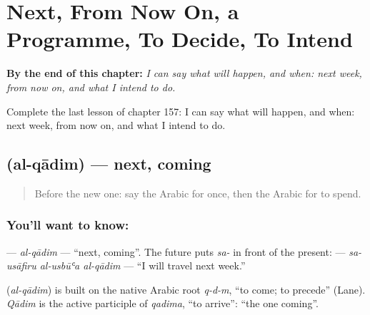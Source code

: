 
\chapter{Next, From Now On, a Programme, To Decide, To Intend}
\label{ch:ar-next-from-now-on-a-programme-to-decide-to-intend}

\begin{chapteropening}
\textbf{By the end of this chapter:} \emph{I can say what will happen, and when: next week, from now on, and what I intend to do.}

Complete the last lesson of chapter 157: I can say what will happen, and when: next week, from now on, and what I intend to do.
\end{chapteropening}

\section[\texorpdfstring{\ar{القادم} (al-qādim)}{القادم (al-qādim)}]{ (al-qādim) — next, coming}

\label{lesson:AR-C157-al-qadim}



\begin{quote}
Before the new one: say the Arabic for once, then the Arabic for to spend.
\end{quote}

\subsection*{You'll want to know: }
\textbf{} — \emph{al-qādim} — \textquotedblleft{}next, coming\textquotedblright{}. The future puts \emph{sa-} in front of the present: \textbf{  } — \emph{sa-usāfiru al-usbūʿa al-qādim} — \textquotedblleft{}I will travel next week.\textquotedblright{}

\begin{cousinweb}
\textbf{} (\emph{al-qādim}) is built on the native Arabic root \emph{q-d-m}, \textquotedblleft{}to come; to precede\textquotedblright{} (Lane). \emph{Qādim} is the active participle of \emph{qadima}, \textquotedblleft{}to arrive\textquotedblright{}: \textquotedblleft{}the one coming\textquotedblright{}.
\end{cousinweb}

